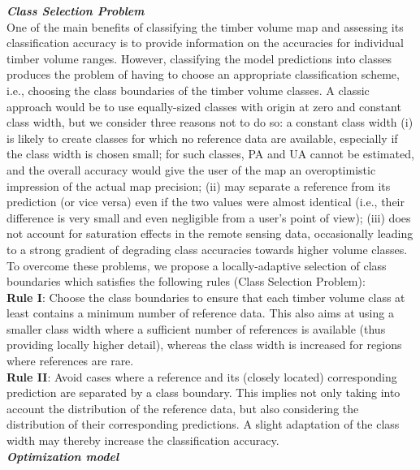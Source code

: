 \textit{\textbf{Class Selection Problem}}\\

One of the main benefits of classifying the timber volume map and assessing its classification accuracy is to provide information on the accuracies for individual timber volume ranges. However, classifying the model predictions into classes produces the problem of having to choose an appropriate classification scheme, i.e., choosing the class boundaries of the timber volume classes. A classic approach would be to use equally-sized classes with origin at zero and constant class width, but we consider three reasons not to do so: a constant class width (i) is likely to create classes for which no reference data are available, especially if the class width is chosen small; for such classes, PA and UA cannot be estimated, and the overall accuracy would give the user of the map an overoptimistic impression of the actual map precision; (ii) may separate a reference from its prediction (or vice versa) even if the two values were almost identical (i.e., their difference is very small and even negligible from a user's point of view); (iii) does not account for saturation effects in the remote sensing data, occasionally leading to a strong gradient of degrading class accuracies towards higher volume classes. To overcome these problems, we propose a locally-adaptive selection of class boundaries which satisfies the following rules (Class Selection Problem):\\

\textbf{Rule I}: Choose the class boundaries to ensure that each timber volume class at least contains a minimum number of reference data. This also aims at using a smaller class width where a sufficient number of references is available (thus providing locally higher detail), whereas the class width is increased for regions where references are rare.\\

\textbf{Rule II}: Avoid cases where a reference and its (closely located) corresponding prediction are separated by a class boundary. This implies not only taking into account the distribution of the reference data, but also considering the distribution of their corresponding predictions. A slight adaptation of the class width may thereby increase the classification accuracy.\\

\textit{\textbf{Optimization model}}\\

